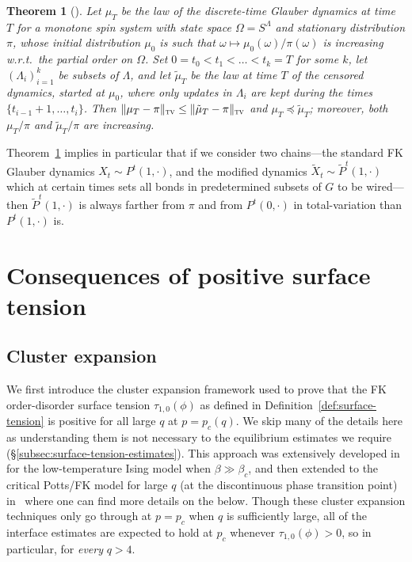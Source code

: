 \documentclass[reqno,11pt]{amsart}
\numberwithin{equation}{section}
\newtheorem{theorem}{Theorem}[section]
\theoremstyle{definition}{
\newtheorem{example}[theorem]{Example}
\newtheorem{definition}[theorem]{Definition}
\newtheorem*{definition*}{Definition}
\newtheorem{problem}[theorem]{Problem}
\newtheorem{question}[theorem]{Question}
\newtheorem{remark}[theorem]{Remark}
}
\newcommand{\tv}{{\textsc{tv}}}
\begin{document}
\begin{theorem}[{\cite[Theorem~1.1]{PW13}}]\label{thm:censoring}
Let $\mu_T$ be the law of the discrete-time Glauber dynamics at time $T$ for a monotone spin system with state space $\Omega=S^\Lambda$ and stationary distribution $\pi$, whose initial distribution $\mu_0$ is such that $\omega\mapsto\mu_0(\omega)/\pi(\omega)$ is increasing w.r.t.\ the partial order on $\Omega$. Set $0=t_0 < t_1 <\ldots < t_k = T$ for some $k$, let $(\Lambda_i)_{i=1}^k$ be subsets of $\Lambda$, and let $\tilde \mu_T$ be the law at time $T$ of the censored dynamics, started at $\mu_0$, where only updates in $\Lambda_i$ are kept during the times $\{t_{i-1}+1,\ldots,t_i\}$. Then $\|\mu_T-\pi\|_\tv \leq \|\tilde\mu_T-\pi\|_\tv$ and $\mu_T \preceq \tilde\mu_T$; moreover, both $\mu_T/\pi$ and $\tilde\mu_T / \pi$ are increasing.
\end{theorem}
Theorem~\ref{thm:censoring} implies in particular that if we consider two chains---the standard FK Glauber dynamics $X_t\sim P^t(1,\cdot)$, and the modified dynamics $\tilde X_t \sim \tilde P^t(1,\cdot)$ which at certain times sets all bonds in predetermined subsets of $G$ to be wired---then $\tilde P^t(1,\cdot)$ is always farther from $\pi$ and from $P^t(0,\cdot)$ in total-variation than $P^t(1,\cdot)$ is.


\section{Consequences of positive surface tension}\label{sec:surface-tension-estimates}

\subsection{Cluster expansion}\label{subsec:cluster-expansion}
We first introduce the cluster expansion framework used to prove that the FK order-disorder surface tension $\tau_{1,0}(\phi)$ as defined in Definition~\ref{def:surface-tension} is positive for all large $q$ at $p=p_c(q)$. We skip many of the details here as understanding them is not necessary to the equilibrium estimates we require (\S\ref{subsec:surface-tension-estimates}). This approach was extensively developed in \cite{DKS} for the low-temperature Ising model when $\beta \gg\beta_c$, and then extended to the critical Potts/FK model for large $q$ (at the discontinuous phase transition point) in~\cite{MMRS91} where one can find more details on the below. Though these cluster expansion techniques only go through at $p=p_c$ when $q$ is sufficiently large, all of the interface estimates are expected to hold at $p_c$ whenever $\tau_{1,0}(\phi)>0$, so in particular, for \emph{every} $q>4$.
\end{document}
